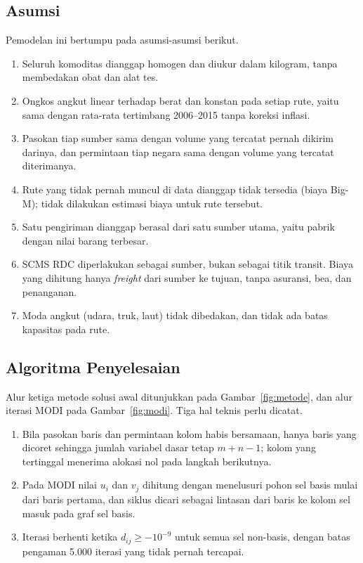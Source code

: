 \documentclass[a4paper,11pt]{article}
\begin{document}
\subsection{Asumsi}
Pemodelan ini bertumpu pada asumsi-asumsi berikut.
\begin{enumerate}
  \item Seluruh komoditas dianggap homogen dan diukur dalam kilogram, tanpa membedakan obat dan alat tes.
  \item Ongkos angkut linear terhadap berat dan konstan pada setiap rute, yaitu sama dengan rata-rata tertimbang 2006--2015 tanpa koreksi inflasi.
  \item Pasokan tiap sumber sama dengan volume yang tercatat pernah dikirim darinya, dan permintaan tiap negara sama dengan volume yang tercatat diterimanya.
  \item Rute yang tidak pernah muncul di data dianggap tidak tersedia (biaya Big-M); tidak dilakukan estimasi biaya untuk rute tersebut.
  \item Satu pengiriman dianggap berasal dari satu sumber utama, yaitu pabrik dengan nilai barang terbesar.
  \item SCMS RDC diperlakukan sebagai sumber, bukan sebagai titik transit. Biaya yang dihitung hanya \textit{freight} dari sumber ke tujuan, tanpa asuransi, bea, dan penanganan.
  \item Moda angkut (udara, truk, laut) tidak dibedakan, dan tidak ada batas kapasitas pada rute.
\end{enumerate}



\subsection{Algoritma Penyelesaian}
Alur ketiga metode solusi awal ditunjukkan pada Gambar~\ref{fig:metode}, dan alur iterasi MODI pada Gambar~\ref{fig:modi}. Tiga hal teknis perlu dicatat.
\begin{enumerate}
  \item Bila pasokan baris dan permintaan kolom habis bersamaan, hanya baris yang dicoret sehingga jumlah variabel dasar tetap $m+n-1$; kolom yang tertinggal menerima alokasi nol pada langkah berikutnya.
  \item Pada MODI nilai $u_i$ dan $v_j$ dihitung dengan menelusuri pohon sel basis mulai dari baris pertama, dan siklus dicari sebagai lintasan dari baris ke kolom sel masuk pada graf sel basis.
  \item Iterasi berhenti ketika $d_{ij} \ge -10^{-9}$ untuk semua sel non-basis, dengan batas pengaman 5.000 iterasi yang tidak pernah tercapai.
\end{enumerate}
\end{document}
